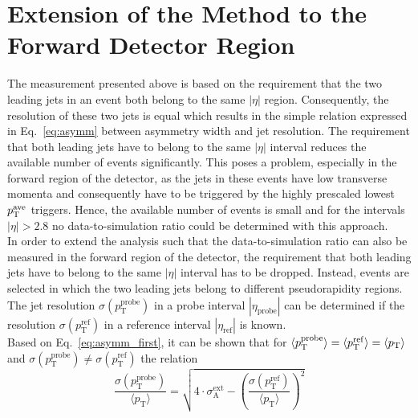 \section{Extension of the Method to the Forward Detector Region}
\label{sec:jer_forward_extension}
The measurement presented above is based on the requirement that the two leading jets in an event both belong to the same $|\eta|$ region. Consequently, the resolution of these two jets is equal which results in the simple relation expressed in Eq.~\ref{eq:asymm} between asymmetry width and jet resolution. The requirement that both leading jets have to belong to the same $|\eta|$ interval reduces the available number of events significantly. This poses a problem, especially in the forward region of the detector, as the jets in these events have low transverse momenta and consequently have to be triggered by the highly prescaled lowest $p_{\text{T}}^\mathrm{ave}$ triggers. Hence, the available number of events is small and for the intervals $|\eta| > 2.8$ no data-to-simulation ratio could be determined with this approach. \\
In order to extend the analysis such that the data-to-simulation ratio can also be measured in the forward region of the detector, the requirement that both leading jets have to belong to the same $|\eta|$ interval has to be dropped. Instead, events are selected in which the two leading jets belong to different pseudorapidity regions. The jet resolution $\sigma (p_\mathrm{T}^{\mathrm{probe}})$ in a probe interval $|\eta_\mathrm{probe}|$ can be determined if the resolution $\sigma (p_\mathrm{T}^{\mathrm{ref}})$ in a reference interval $|\eta_\mathrm{ref}|$ is known. \\
Based on Eq.~\ref{eq:asymm_first}, it can be shown that for $\langle p^\mathrm{probe}_\mathrm{T} \rangle = \langle p^\mathrm{ref}_\mathrm{T} \rangle = \langle p_{\text{T}} \rangle$ and $\sigma (p_\mathrm{T}^{\mathrm{probe}}) \neq \sigma (p_\mathrm{T}^{\mathrm{ref}})$ the relation
\begin{equation}
 \label{eq:asymm_forward}
  \frac{\sigma (p^\mathrm{probe}_\mathrm{T})}{\langle p_\mathrm{T} \rangle} = \sqrt{4 \cdot \sigma_\mathrm{A}^\mathrm{ext} - \left(\frac{\sigma (p^\mathrm{ref}_\mathrm{T})}{\langle p_\mathrm{T} \rangle} \right)^2} 
 \end{equation}
